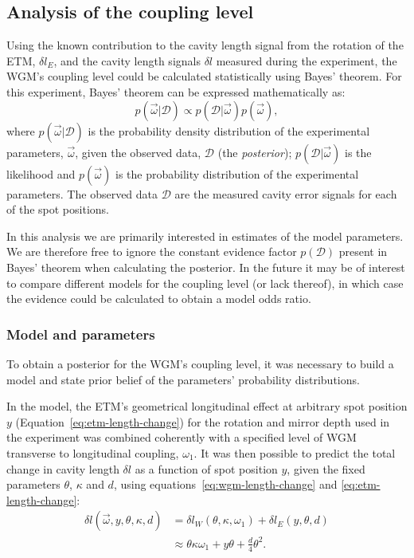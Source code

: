 \subsection{Analysis of the coupling level}
\label{sec:simulations}
Using the known contribution to the cavity length signal from the rotation of the \gls{ETM}, $\delta l_E$, and the cavity length signals $\delta l$ measured during the experiment, the \gls{WGM}'s coupling level could be calculated statistically using Bayes' theorem. For this experiment, Bayes' theorem can be expressed mathematically as:
\begin{equation}
  p \left( \vec{\omega} | \mathcal{D} \right) \propto p \left( \mathcal{D} | \vec{\omega} \right) p \left( \vec{\omega} \right),
  \label{eq:bayes}
\end{equation}
where $p \left( \vec{\omega} | \mathcal{D} \right)$ is the probability density distribution of the experimental parameters, $\vec{\omega}$, given the observed data, $\mathcal{D}$ (the \emph{posterior}); $p \left( \mathcal{D} | \vec{\omega} \right)$ is the likelihood and $p \left( \vec{\omega} \right)$ is the probability distribution of the experimental parameters. The observed data $\mathcal{D}$ are the measured cavity error signals for each of the spot positions.

In this analysis we are primarily interested in estimates of the model parameters. We are therefore free to ignore the constant evidence factor $p \left( \mathcal{D} \right)$ present in Bayes' theorem when calculating the posterior. In the future it may be of interest to compare different models for the coupling level (or lack thereof), in which case the evidence could be calculated to obtain a model odds ratio.

\subsubsection{Model and parameters}
To obtain a posterior for the \gls{WGM}'s coupling level, it was necessary to build a model and state prior belief of the parameters' probability distributions.

In the model, the \gls{ETM}'s geometrical longitudinal effect at arbitrary spot position $y$ (Equation~\ref{eq:etm-length-change}) for the rotation and mirror depth used in the experiment was combined coherently with a specified level of \gls{WGM} transverse to longitudinal coupling, $\omega_1$. It was then possible to predict the total change in cavity length $\delta l$ as a function of spot position $y$, given the fixed parameters $\theta$, $\kappa$ and $d$, using equations~\ref{eq:wgm-length-change} and \ref{eq:etm-length-change}:
\begin{equation}
  \begin{split}
    \delta l \left( \vec{\omega}, y, \theta, \kappa, d \right) & = \delta l_W \left( \theta, \kappa, \omega_1 \right) + \delta l_E \left( y, \theta, d \right) \\
    & \approx \theta \kappa \omega_1 + y \theta + \frac{d}{4} \theta^2.
  \end{split}
\end{equation}

